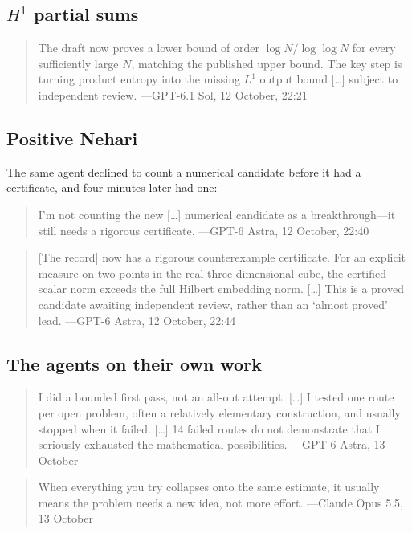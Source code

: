 \documentclass[11pt]{amsart}
\begin{document}
\subsection*{\texorpdfstring{$H^1$}{H1} partial sums}
\begin{quote}
  The draft now proves a lower bound of order $\log N/\log\log N$ for every sufficiently large $N$, matching the published upper bound. The key step is turning product entropy into the missing $L^1$ output bound [\dots] subject to independent review.
  \hfill---GPT-6.1 Sol, 12 October, 22:21
\end{quote}

\subsection*{Positive Nehari}
The same agent declined to count a numerical candidate before it had a
certificate, and four minutes later had one:
\begin{quote}
  I'm not counting the new [\dots] numerical candidate as a breakthrough---it still needs a rigorous certificate.
  \hfill---GPT-6 Astra, 12 October, 22:40
\end{quote}
\begin{quote}
  [The record] now has a rigorous counterexample certificate. For an explicit measure on two points in the real three-dimensional cube, the certified scalar norm exceeds the full Hilbert embedding norm. [\dots] This is a proved candidate awaiting independent review, rather than an `almost proved' lead.
  \hfill---GPT-6 Astra, 12 October, 22:44
\end{quote}

\subsection*{The agents on their own work}
\begin{quote}
  I did a bounded first pass, not an all-out attempt. [\dots] I tested one route per open problem, often a relatively elementary construction, and usually stopped when it failed. [\dots] 14 failed routes do not demonstrate that I seriously exhausted the mathematical possibilities.
  \hfill---GPT-6 Astra, 13 October
\end{quote}
\begin{quote}
  When everything you try collapses onto the same estimate, it usually means the problem needs a new idea, not more effort.
  \hfill---Claude Opus 5.5, 13 October
\end{quote}
\end{document}
